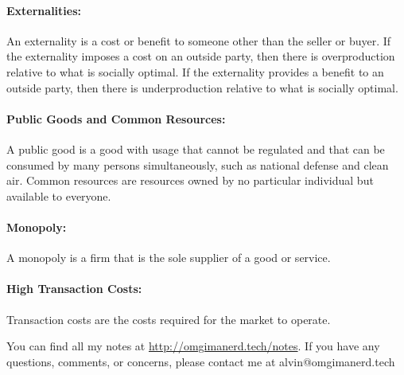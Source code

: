 \documentclass[letterpaper, 12pt]{article}
\begin{document}
\paragraph{Externalities:}
An externality is a cost or benefit to someone other than the seller or buyer.
If the externality imposes a cost on an outside party, then there is
overproduction relative to what is socially optimal. If the externality provides
a benefit to an outside party, then there is underproduction relative to what is
socially optimal.

\paragraph{Public Goods and Common Resources:}
A public good is a good with usage that cannot be regulated and that can be
consumed by many persons simultaneously, such as national defense and clean air.
Common resources are resources owned by no particular individual but available
to everyone.

\paragraph{Monopoly:}
A monopoly is a firm that is the sole supplier of a good or service.

\paragraph{High Transaction Costs:}
Transaction costs are the costs required for the market to operate.

\begin{center}
  You can find all my notes at \url{http://omgimanerd.tech/notes}. If you have
  any questions, comments, or concerns, please contact me at
  alvin@omgimanerd.tech
\end{center}
\end{document}
